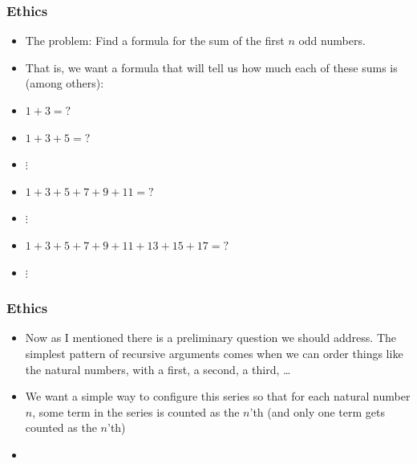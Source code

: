 \begin{frame}
\frametitle{Ethics}

\begin{itemize}[<+->]
\item 
The problem: Find a formula for the sum of the first $n$ odd numbers.

\item That is, we want a formula that will tell us how much each of these sums is (among others):

\item $1+3 = ?$
\item $1+3+5 = ?$
\item $\vdots$
\item $1+3+5+7+9+11 = ?$
\item $\vdots$
\item $1+3+5+7+9+11+13+15+17 = ?$
\item $\vdots$

\end{itemize} 
\end{frame}


\begin{frame}
\frametitle{Ethics}

\begin{itemize}[<+->]
\item 

Now as I mentioned there is a preliminary question we should address. The simplest pattern of recursive arguments comes when we can order things like the natural numbers, with a first, a second, a third, \ldots

\item We want a simple way to configure this series so that for each natural number $n$, some term in the series is counted as the $n$'th (and only one term gets counted as the $n$'th)

\item 
\end{itemize} 
\end{frame}


